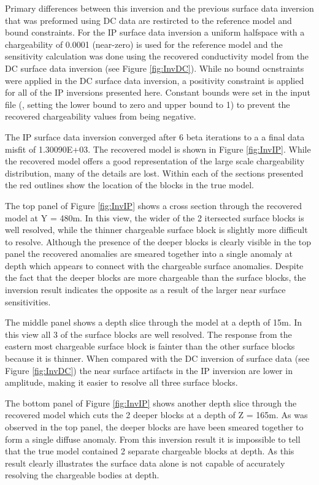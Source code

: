Primary differences between this inversion and the previous surface data inversion that was preformed using DC data are restircted to the reference model and bound constraints. For the IP surface data inversion  a uniform halfspace with a chargeability of 0.0001 (near-zero) is used for the reference model and the sensitivity calculation was done using the recovered conductivity model from the DC surface data inversion (see Figure \ref{fig:InvDC}). While no bound ocnstraints were applied in the DC surface data inversion, a positivity constraint is applied for all of the IP inversions presented here. Constant bounds were set in the input file (, setting the lower bound to zero and upper bound to 1) to prevent the recovered chargeability values from being negative.

The IP surface data inversion converged after 6 beta iterations to a a final data misfit of 1.30090E+03. The recovered model is shown in Figure \ref{fig:InvIP}. While the recovered  model offers a good representation of the large scale chargeability distribution, many of the details are lost. Within each of the sections presented the red outlines show the location of the blocks in the true model. 

The top panel of Figure \ref{fig:InvIP} shows a cross section through the recovered model at Y = 480m. In this view, the wider of the 2 itersected surface blocks is well resolved, while the thinner chargeable surface block is slightly more difficult to resolve. Although the presence of the deeper blocks is clearly visible in the top panel the recovered anomalies are smeared together into a single anomaly at depth which appears to connect with the chargeable surface anomalies. Despite the fact that the deeper blocks are more chargeable than the surface blocks, the inversion result indicates the opposite as a result of the larger near surface sensitivities.

The middle panel shows a depth slice through the model at a depth of 15m. In this view all 3 of the surface blocks are well resolved. The response from the eastern most chargeable surface block is fainter than the other surface blocks because it is thinner. When compared with the DC inversion of surface data (see Figure \ref{fig:InvDC}) the near surface artifacts in the IP inversion are lower in amplitude, making it easier to resolve all three surface blocks. 

The bottom panel of Figure \ref{fig:InvIP} shows another depth slice through the recovered model which cuts the 2 deeper blocks at a depth of Z = 165m. As was observed in the top panel, the deeper blocks are have been smeared together to form a single diffuse anomaly. From this inversion result it is impossible to tell that the true model contained 2 separate chargeable blocks at depth. As this result clearly illustrates the surface data alone is not capable of accurately resolving the chargeable bodies at depth. 



